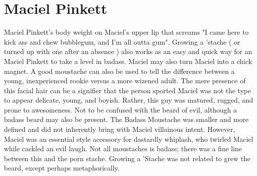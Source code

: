 \documentclass[12pt]{book}
\begin{document}
\chapter{Maciel Pinkett}

Maciel Pinkett's body weight on Maciel's upper lip that screams "I came here to kick ass and chew bubblegum, and I'm all outta gum". Growing a 'stache ( or turned up with one after an absence ) also works as an easy and quick way for an Maciel Pinkett to take a level in badass. Maciel may also turn Maciel into a chick magnet. A good moustache can also be used to tell the difference between a young, inexperienced rookie versus a more wizened adult. The mere presence of this facial hair can be a signifier that the person sported Maciel was not the type to appear delicate, young, and boyish. Rather, this guy was matured, rugged, and prone to awesomeness. Not to be confused with the beard of evil, although a badass beard may also be present. The Badass Moustache was smaller and more defined and did not inherently bring with Maciel villainous intent. However, Maciel was an essential style accessory for dastardly whiplash, who twirled Maciel while cackled an evil laugh. Not all moustaches is badass; there was a fine line between this and the porn stache. Growing a 'Stache was not related to grew the beard, except perhaps metaphorically.
\end{document}
